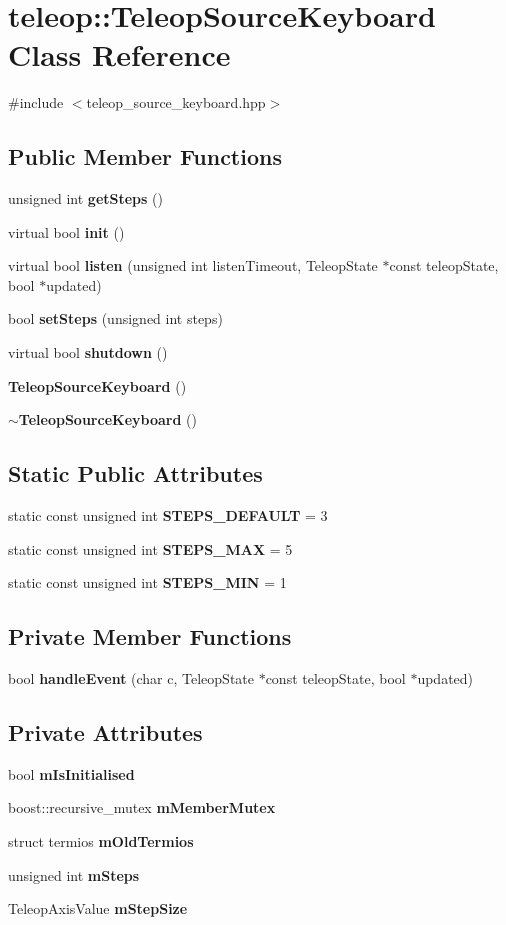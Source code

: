 \section{teleop::TeleopSourceKeyboard Class Reference}
\label{classteleop_1_1TeleopSourceKeyboard}


{\ttfamily \#include $<$teleop\_\-source\_\-keyboard.hpp$>$}

\subsection*{Public Member Functions}
\begin{DoxyCompactItemize}
\item 
unsigned int {\bf getSteps} ()
\item 
virtual bool {\bf init} ()
\item 
virtual bool {\bf listen} (unsigned int listenTimeout, TeleopState $\ast$const teleopState, bool $\ast$updated)
\item 
bool {\bf setSteps} (unsigned int steps)
\item 
virtual bool {\bf shutdown} ()
\item 
{\bf TeleopSourceKeyboard} ()
\item 
{\bf $\sim$TeleopSourceKeyboard} ()
\end{DoxyCompactItemize}
\subsection*{Static Public Attributes}
\begin{DoxyCompactItemize}
\item 
static const unsigned int {\bf STEPS\_\-DEFAULT} = 3
\item 
static const unsigned int {\bf STEPS\_\-MAX} = 5
\item 
static const unsigned int {\bf STEPS\_\-MIN} = 1
\end{DoxyCompactItemize}
\subsection*{Private Member Functions}
\begin{DoxyCompactItemize}
\item 
bool {\bf handleEvent} (char c, TeleopState $\ast$const teleopState, bool $\ast$updated)
\end{DoxyCompactItemize}
\subsection*{Private Attributes}
\begin{DoxyCompactItemize}
\item 
bool {\bf mIsInitialised}
\item 
boost::recursive\_\-mutex {\bf mMemberMutex}
\item 
struct termios {\bf mOldTermios}
\item 
unsigned int {\bf mSteps}
\item 
TeleopAxisValue {\bf mStepSize}
\end{DoxyCompactItemize}
